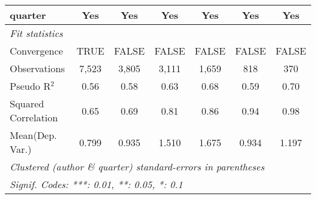 \begin{tabular}{lcccccc}
   quarter                                                    & Yes           & Yes           & Yes           & Yes           & Yes        & Yes\\  
   \midrule
   \emph{Fit statistics}\\
   Convergence                                                &TRUE           & FALSE         & FALSE         & FALSE         & FALSE      & FALSE\\  
   Observations                                               & 7,523         & 3,805         & 3,111         & 1,659         & 818        & 370\\  
   Pseudo R$^2$                                               & 0.56          & 0.58          & 0.63          & 0.68          & 0.59       & 0.70\\  
   Squared Correlation                                        & 0.65          & 0.69          & 0.81          & 0.86          & 0.94       & 0.98\\  
Mean(Dep. Var.) & 0.799 & 0.935 & 1.510 & 1.675 & 0.934 & 1.197 \\
   \midrule \midrule
   \multicolumn{7}{l}{\emph{Clustered (author \& quarter) standard-errors in parentheses}}\\
   \multicolumn{7}{l}{\emph{Signif. Codes: ***: 0.01, **: 0.05, *: 0.1}}\\
\end{tabular}
\par\endgroup
